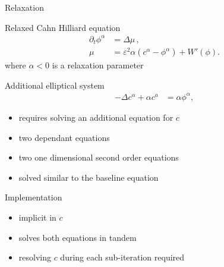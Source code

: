 \documentclass[presentation]{beamer}
\begin{document}
\begin{frame}[label={sec:orgc31f08d}]{Relaxation}
\begin{block}{Relaxed Cahn Hilliard equation}
\begin{equation}
\label{eq:relaxed-cahn-hilliard}
\begin{aligned}
\partial_t \phi^\alpha  &= \Delta \mu \,,\\
\mu &= \varepsilon ^2 \alpha(c^\alpha - \phi^\alpha) + W'(\phi) .
\end{aligned}
\end{equation}
where  \(\alpha < 0\)  is a relaxation parameter
\end{block}
\begin{block}{Additional elliptical system}
\begin{align}
\label{eq:elliptical-equation}
- \Delta c^\alpha  + \alpha c^a &= \alpha \phi ^\alpha,
\end{align}
\begin{itemize}
\item requires solving an additional equation for \(c\)
\item two dependant equations
\item two one dimensional second order equations
\item solved similar to the baseline equation
\end{itemize}
\end{block}
\begin{block}{Implementation}
\begin{itemize}
\item implicit in \(c\)
\item solves both equations in tandem
\item resolving \(c\) during each sub-iteration required
\end{itemize}
\end{block}
\end{frame}
\end{document}
